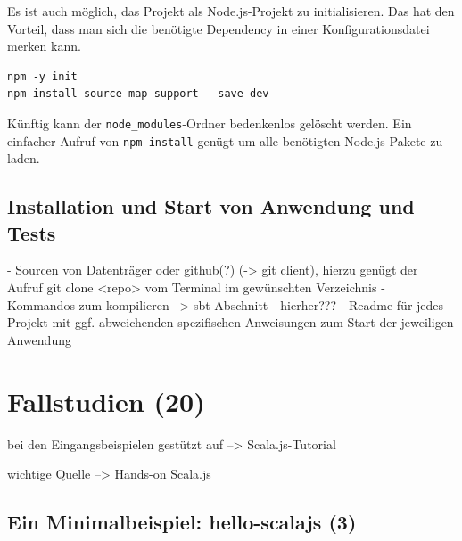 \documentclass[a4paper, 12pt, listof=totoc, bibliography=totoc]{scrreprt}
\begin{document}
Es ist auch möglich, das Projekt als Node.js-Projekt zu initialisieren. Das hat den Vorteil, dass man sich die benötigte Dependency in einer Konfigurationsdatei merken kann.

\begin{lstlisting}
npm -y init
npm install source-map-support --save-dev
\end{lstlisting}

Künftig kann der \texttt{node\_modules}-Ordner bedenkenlos gelöscht werden. Ein einfacher Aufruf von \texttt{npm install} genügt um alle benötigten Node.js-Pakete zu laden.


\section{Installation und Start von Anwendung und Tests}

- Sourcen von Datenträger oder github(?) (-> git client), hierzu genügt der Aufruf git clone <repo> vom Terminal im gewünschten Verzeichnis
- Kommandos zum kompilieren --> sbt-Abschnitt - hierher???
- Readme für jedes Projekt mit ggf. abweichenden spezifischen Anweisungen zum Start der jeweiligen Anwendung


\chapter{Fallstudien (20)}

bei den Eingangsbeispielen gestützt auf
-->  Scala.js-Tutorial

wichtige Quelle
-->  Hands-on Scala.js


\section{Ein Minimalbeispiel: hello-scalajs (3)}


%
%
%
%
\end{document}

